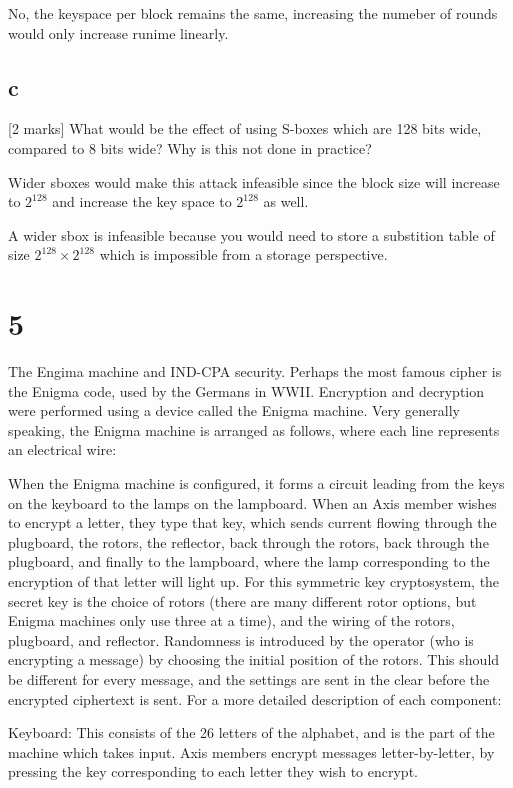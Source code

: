 \documentclass[11pt]{article}
\begin{document}
No, the keyspace per block remains the same, increasing the numeber of rounds would only increase runime linearly.

\subsection{c} [2 marks] What would be the effect of using S-boxes which are 128 bits wide, compared to 8 bits wide? Why is this not done in practice?

Wider sboxes would make this attack infeasible since the block size will increase to $2^{128}$ and increase the key space to $2^{128}$ as well.

A wider sbox is infeasible because you would need to store a substition table of size $2^{128} \times 2^{128}$ which is impossible from a storage perspective.


\section{5}

The Engima machine and IND-CPA security. Perhaps the most famous cipher is the Enigma code, used by the Germans in WWII. Encryption and decryption were performed using a device called the Enigma machine. Very generally speaking, the Enigma machine is arranged as follows, where each line represents an electrical wire:

When the Enigma machine is conﬁgured, it forms a circuit leading from the keys on the keyboard to the lamps on the lampboard. When an Axis member wishes to encrypt a letter, they type that key, which sends current ﬂowing through the plugboard, the rotors, the reﬂector, back through the rotors, back through the plugboard, and ﬁnally to the lampboard, where the lamp corresponding to the encryption of that letter will light up. For this symmetric key cryptosystem, the secret key is the choice of rotors (there are many diﬀerent rotor options, but Enigma machines only use three at a time), and the wiring of the rotors, plugboard, and reﬂector. Randomness is introduced by the operator (who is encrypting a message) by choosing the initial position of the rotors. This should be diﬀerent for every message, and the settings are sent in the clear before the encrypted ciphertext is sent. For a more detailed description of each component:

Keyboard: This consists of the 26 letters of the alphabet, and is the part of the machine which takes input. Axis members encrypt messages letter-by-letter, by pressing the key corresponding to each letter they wish to encrypt.
\end{document}
